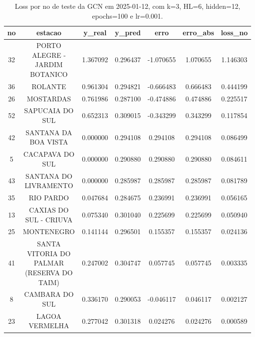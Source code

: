 \begin{table}[h]
\centering
\caption{Loss por no de teste da GCN em 2025-01-12, com k=3, HL=6, hidden=12, epochs=100 e lr=0.001.}
\label{tab:gcn_loss_k3_hl6_h12_e100_d20250112}
\begin{tabular}{ccccccc}
\toprule
no & estacao & y\_real & y\_pred & erro & erro\_abs & loss\_no \\
\midrule
32 & PORTO ALEGRE - JARDIM BOTANICO & 1.367092 & 0.296437 & -1.070655 & 1.070655 & 1.146303 \\
36 & ROLANTE & 0.961304 & 0.294821 & -0.666483 & 0.666483 & 0.444199 \\
26 & MOSTARDAS & 0.761986 & 0.287100 & -0.474886 & 0.474886 & 0.225517 \\
52 & SAPUCAIA DO SUL & 0.652313 & 0.309015 & -0.343299 & 0.343299 & 0.117854 \\
42 & SANTANA DA BOA VISTA & 0.000000 & 0.294108 & 0.294108 & 0.294108 & 0.086499 \\
5 & CACAPAVA DO SUL & 0.000000 & 0.290880 & 0.290880 & 0.290880 & 0.084611 \\
43 & SANTANA DO LIVRAMENTO & 0.000000 & 0.285987 & 0.285987 & 0.285987 & 0.081789 \\
35 & RIO PARDO & 0.047684 & 0.284675 & 0.236991 & 0.236991 & 0.056165 \\
13 & CAXIAS DO SUL - CRIUVA & 0.075340 & 0.301040 & 0.225699 & 0.225699 & 0.050940 \\
25 & MONTENEGRO & 0.141144 & 0.296501 & 0.155357 & 0.155357 & 0.024136 \\
41 & SANTA VITORIA DO PALMAR (RESERVA DO TAIM) & 0.247002 & 0.304747 & 0.057745 & 0.057745 & 0.003335 \\
8 & CAMBARA DO SUL & 0.336170 & 0.290053 & -0.046117 & 0.046117 & 0.002127 \\
23 & LAGOA VERMELHA & 0.277042 & 0.301318 & 0.024276 & 0.024276 & 0.000589 \\
\bottomrule
\end{tabular}
\end{table}
